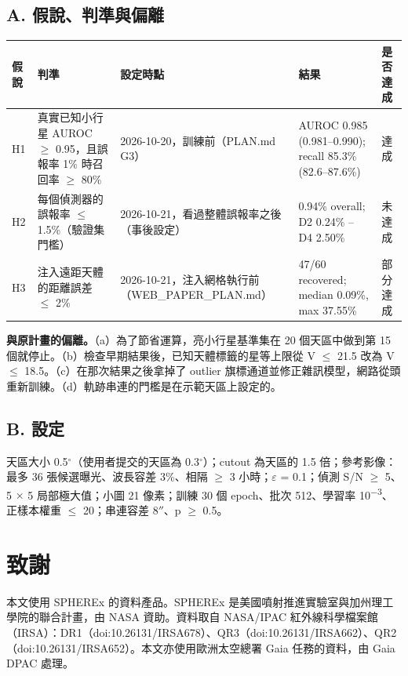 \documentclass[twocolumn]{aastex631}
\begin{document}
\subsection*{A. 假說、判準與偏離}
\begin{table}[t]
\centering
\footnotesize

\begin{tabularx}{\textwidth}{lXXXl}
\hline\hline
假說 & 判準 & 設定時點 & 結果 & 是否達成 \\
\hline
H1 & 真實已知小行星 AUROC $\ge$ 0.95，且誤報率 1\% 時召回率 $\ge$ 80\% & 2026-10-20，訓練前（PLAN.md G3） & AUROC 0.985 (0.981--0.990); recall 85.3\% (82.6--87.6\%) & 達成 \\
H2 & 每個偵測器的誤報率 $\le$ 1.5\%（驗證集門檻） & 2026-10-21，看過整體誤報率之後（事後設定） & 0.94\% overall; D2 0.24\% -- D4 2.50\% & 未達成 \\
H3 & 注入遠距天體的距離誤差 $\le$ 2\% & 2026-10-21，注入網格執行前（WEB\_PAPER\_PLAN.md） & 47/60 recovered; median 0.09\%, max 37.55\% & 部分達成 \\
\hline
\end{tabularx}
\end{table}
\textbf{與原計畫的偏離。}（a）為了節省運算，亮小行星基準集在 20 個天區中做到第 15 個就停止。（b）檢查早期結果後，已知天體標籤的星等上限從 V $\le$ 21.5 改為 V $\le$ 18.5。（c）在那次結果之後拿掉了 outlier 旗標通道並修正雜訊模型，網路從頭重新訓練。（d）軌跡串連的門檻是在示範天區上設定的。

\subsection*{B. 設定}
天區大小 0.5$^\circ$（使用者提交的天區為 0.3$^\circ$）；cutout 為天區的 1.5 倍；參考影像：最多 36 張候選曝光、波長容差 3\%、相隔 $\ge$ 3 小時；$\varepsilon$ = 0.1；偵測 S/N $\ge$ 5、5 $\times$ 5 局部極大值；小圖 21 像素；訓練 30 個 epoch、批次 512、學習率 10\textsuperscript{$-$3}、正樣本權重 $\le$ 20；串連容差 8$''$、p $\ge$ 0.5。

\section*{致謝}
本文使用 SPHEREx 的資料產品。SPHEREx 是美國噴射推進實驗室與加州理工學院的聯合計畫，由 NASA 資助。資料取自 NASA/IPAC 紅外線科學檔案館（IRSA）：DR1（doi:10.26131/IRSA678）、QR3（doi:10.26131/IRSA662）、QR2（doi:10.26131/IRSA652）。本文亦使用歐洲太空總署 Gaia 任務的資料，由 Gaia DPAC 處理。
\end{document}
